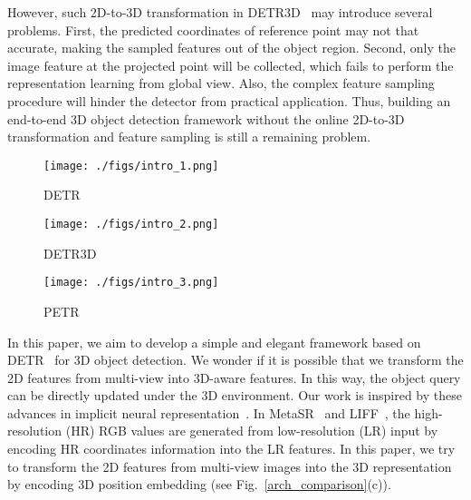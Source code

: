 \documentclass[runningheads]{llncs}
\begin{document}
However, such 2D-to-3D transformation in DETR3D~\cite{wang2022detr3d} may introduce several problems. First, the predicted coordinates of reference point may not that accurate, making the sampled features out of the object region. Second, only the image feature at the projected point will be collected, which fails to perform the representation learning from global view. Also, the complex feature sampling procedure will hinder the detector from practical application.
Thus, building an end-to-end 3D object detection framework without the online 2D-to-3D transformation and feature sampling is still a remaining problem.

\begin{figure*}[t]
	\centering  
	\begin{subfigure}{.32\textwidth}
			\centering
			\texttt{[image: ./figs/intro\_1.png]}
			\caption{DETR}
		\end{subfigure}
	\begin{subfigure}{.32\textwidth}
			\centering
			\texttt{[image: ./figs/intro\_2.png]}
			\caption{DETR3D}
		\end{subfigure}
	\begin{subfigure}{.32\textwidth}
			\centering
			\texttt{[image: ./figs/intro\_3.png]}
			\caption{PETR}
		\end{subfigure}
	\caption{Comparison of DETR, DETR3D, and our proposed PETR. (a) In DETR, the object queries interact with 2D features to perform 2D detection. (b) DETR3D repeatedly projects the generated 3D reference points into image plane and samples the 2D features to interact with object queries in decoder. (c) PETR generates the 3D position-aware features by encoding the 3D position embedding (3D PE) into 2D image features. The object queries directly interact with 3D position-aware features and output 3D detection results.}  
	\label{arch_comparison}
\end{figure*}

In this paper, we aim to develop a simple and elegant framework based on DETR~\cite{carion2020detr} for 3D object detection. We wonder if it is possible that we transform the 2D features from multi-view into 3D-aware features. In this way, the object query can be directly updated under the 3D environment. Our work is inspired by these advances in implicit neural representation~\cite{hu2019metasr,chen2021liff,mildenhall2020nerf}. 
In MetaSR~\cite{hu2019metasr} and LIFF~\cite{chen2021liff}, the high-resolution (HR) RGB values are generated from low-resolution (LR) input by encoding HR coordinates information into the LR features. In this paper, we try to transform the 2D features from multi-view images into the 3D representation by encoding 3D position embedding (see Fig.~\ref{arch_comparison}(c)).
\end{document}
